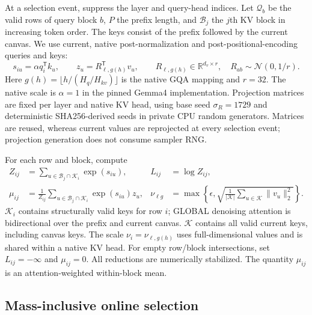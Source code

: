 At a selection event, suppress the layer and query-head indices. Let
$\mathcal Q_b$ be the valid rows of query block $b$, $P$ the prefix length,
and $\mathcal B_j$ the $j$th KV block in increasing token order. The keys
consist of the prefix followed by the current canvas. We use current,
native post-normalization and post-positional-encoding queries and keys:
\begin{equation}
 s_{iu}=\alpha q_i^{\mathsf T}k_u,
 \qquad z_u=R_{\ell,g(h)}^{\mathsf T}v_u,
 \qquad R_{\ell,g(h)}\in\mathbb R^{d_v\times r},
 \quad R_{ab}\sim\mathcal N(0,1/r).
 \label{eq:v2-projection}
\end{equation}
Here $g(h)=\lfloor h/(H_q/H_{kv})\rfloor$ is the native GQA mapping and
$r=32$. The native scale is $\alpha=1$ in the pinned Gemma4 implementation.
Projection matrices are fixed per layer and native KV head, using base seed
$\sigma_R=1729$ and deterministic SHA256-derived seeds in private CPU random
generators. Matrices are reused, whereas current values are reprojected at
every selection event; projection generation does not consume sampler RNG.

For each row and block, compute
\begin{align}
 Z_{ij}&=\sum_{u\in\mathcal B_j\cap\mathcal K_i}\exp(s_{iu}),
 & L_{ij}&=\log Z_{ij}, \label{eq:v2-mass}\\
 \mu_{ij}&=\frac{1}{Z_{ij}}
       \sum_{u\in\mathcal B_j\cap\mathcal K_i}\exp(s_{iu})z_u,
 & \nu_{\ell g}&=\max\!\left\{\epsilon,
       \sqrt{\frac{1}{|\mathcal K|}
       \sum_{u\in\mathcal K}\|v_u\|_2^2}\right\}.
 \label{eq:v2-mean-scale}
\end{align}
$\mathcal K_i$ contains structurally valid keys for row $i$; GLOBAL
denoising attention is bidirectional over the prefix and current canvas.
$\mathcal K$ contains all valid current keys, including canvas keys.
The scale $\nu_i=\nu_{\ell,g(h)}$ uses full-dimensional values and is shared
within a native KV head. For empty row/block intersections, set
$L_{ij}=-\infty$ and $\mu_{ij}=0$. All reductions are numerically stabilized.
The quantity $\mu_{ij}$ is an attention-weighted within-block mean.

\subsection{Mass-inclusive online selection}
\label{sec:v2-selection}

